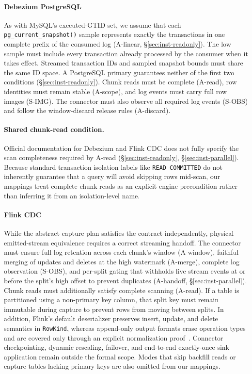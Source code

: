 \documentclass[sigconf,nonacm,10pt]{acmart}
\theoremstyle{plain}
\theoremstyle{definition}
\begin{document}
\paragraph{Debezium PostgreSQL}
As with MySQL's executed-GTID set, we assume that each
\texttt{pg\_\allowbreak{}current\_\allowbreak{}snapshot()} sample
represents exactly the transactions in one complete prefix of the
consumed log (A-linear, \S\ref{sec:inst-readonly}). The low sample must
include every transaction already processed by the consumer when it takes
effect. Streamed transaction IDs and sampled snapshot bounds must
share the same ID space. A PostgreSQL primary guarantees neither of the
first two conditions (\S\ref{sec:inst-readonly}). Chunk reads must be complete (A-read), row
identities must remain stable (A-scope), and log events must carry full
row images (S-IMG). The connector must also observe all required log
events (S-OBS) and follow the window-discard release rules (A-discard).

\paragraph{Shared chunk-read condition.} Official documentation for Debezium and Flink 
CDC does not fully specify the scan completeness required by A-read (\S\ref{sec:inst-readonly}, \S\ref{sec:inst-parallel}). 
Because standard transaction isolation labels like \texttt{READ COMMITTED} do not inherently 
guarantee that a query will avoid skipping rows mid-scan, our mappings treat complete chunk 
reads as an explicit engine precondition rather than inferring it from an isolation-level name.

\paragraph{Flink CDC}
While the abstract capture plan satisfies the contract independently, 
physical emitted-stream equivalence requires a correct streaming handoff. 
The connector must ensure full log retention across each chunk's window (A-window), 
faithful merging of updates and deletes at the high watermark (A-merge), complete 
log observation (S-OBS), and per-split gating that withholds live stream events at 
or before the split's high offset to prevent duplicates (A-handoff, \S\ref{sec:inst-parallel}). 
Chunk reads must additionally satisfy complete scanning (A-read). 
If a table is partitioned using a non-primary key column, that split key must remain 
immutable during capture to prevent rows from moving between splits. 
In addition, Flink's default deserializer preserves insert, update, and delete semantics 
in \texttt{RowKind}, whereas append-only output formats erase operation types and are 
covered only through an explicit normalization proof~\cite{flinkcdc_source_code}. 
Connector checkpointing, dynamic rescaling, failover, and end-to-end exactly-once 
sink application remain outside the formal scope. Modes that skip backfill reads or 
capture tables lacking primary keys are also omitted from our mappings.
\end{document}
